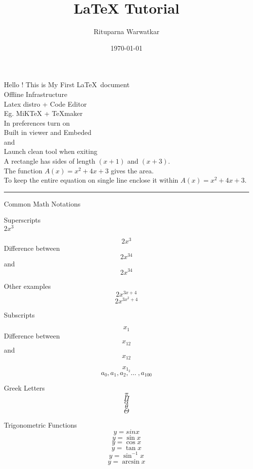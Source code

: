 \documentclass[11pt]{article}
\title{LaTeX Tutorial}
\author{Rituparna Warwatkar}
\date{\today}
\begin{document}
\maketitle
\pagebreak
\tableofcontents
\pagebreak
Hello !
This is My First \LaTeX\ document
\\[1cm]

Offline Infrastructure \\
Latex distro + Code Editor \\
Eg. MiKTeX + TeXmaker \\
In preferences turn on \\
Built in viewer and Embeded \\ 
and \\
Launch clean tool when exiting 
\\[1cm]

A rectangle has sides of length $(x+1)$ and $(x+3)$. \\
The function $A(x) = x^2+4x+3$ gives the area.\\

To keep the entire equation on single line enclose it within ${A(x) = x^2+4x+3}$. \\

\rule{\textwidth}{0.5pt} 

\vspace{0.5cm} %
Common Math Notations

\vspace{0.5cm} 
Superscripts \\
$2x^3$

$$ 2x^3 $$
Difference between
$$ 2x^34 $$ and 
$$ 2x^{34} $$

Other examples
$$ 2x^{3x+4} $$
$$ 2x^{3x^{2}+4} $$

Subscripts 

$$ x_1 $$
Difference between
$$ x_12 $$
and
$$ x_{12} $$

$$ x_{1_2} $$
$$ a_0, a_1, a_2,\ \ldots\ , a_{100} $$

Greek Letters
$$ \pi $$
$$ \Pi $$
$$ \alpha $$
$$ \theta $$
$$ \Theta $$

Trigonometric Functions
$$ y = sin x $$
$$ y = \sin x $$
$$ y = \cos x $$
$$ y = \tan x $$
$$ y = \sin^{-1} x $$
$$ y = \arcsin x $$
\end{document}
